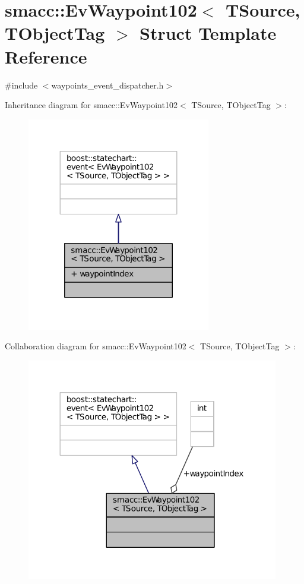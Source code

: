 \hypertarget{structsmacc_1_1EvWaypoint102}{}\section{smacc\+:\+:Ev\+Waypoint102$<$ T\+Source, T\+Object\+Tag $>$ Struct Template Reference}
\label{structsmacc_1_1EvWaypoint102}


{\ttfamily \#include $<$waypoints\+\_\+event\+\_\+dispatcher.\+h$>$}



Inheritance diagram for smacc\+:\+:Ev\+Waypoint102$<$ T\+Source, T\+Object\+Tag $>$\+:
\nopagebreak
\begin{figure}[H]
\begin{center}
\leavevmode
\includegraphics[width=227pt]{structsmacc_1_1EvWaypoint102__inherit__graph}
\end{center}
\end{figure}


Collaboration diagram for smacc\+:\+:Ev\+Waypoint102$<$ T\+Source, T\+Object\+Tag $>$\+:
\nopagebreak
\begin{figure}[H]
\begin{center}
\leavevmode
\includegraphics[width=312pt]{structsmacc_1_1EvWaypoint102__coll__graph}
\end{center}
\end{figure}
